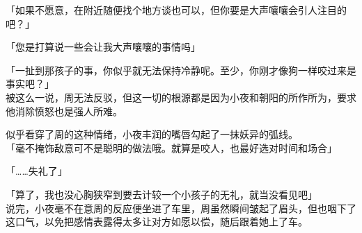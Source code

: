 「如果不愿意，在附近随便找个地方谈也可以，但你要是大声嚷嚷会引人注目的吧？」

「您是打算说一些会让我大声嚷嚷的事情吗」

「一扯到那孩子的事，你似乎就无法保持冷静呢。至少，你刚才像狗一样咬过来是事实吧？」\\

被这么一说，周无法反驳，但这一切的根源都是因为小夜和朝阳的所作所为，要求他消除愤怒也是强人所难。

似乎看穿了周的这种情绪，小夜丰润的嘴唇勾起了一抹妖异的弧线。\\

「毫不掩饰敌意可不是聪明的做法哦。就算是咬人，也最好选对时间和场合」

「……失礼了」

「算了，我也没心胸狭窄到要去计较一个小孩子的无礼，就当没看见吧」\\

说完，小夜毫不在意周的反应便坐进了车里，周虽然瞬间皱起了眉头，但也咽下了这口气，以免把感情表露得太多让对方如愿以偿，随后跟着她上了车。
